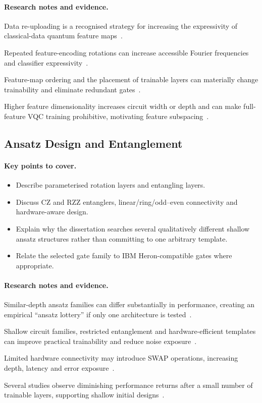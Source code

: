 \documentclass[]{UCD_CS_MSc_AAI_Report}
\newcommand{\challenge}[1]{{\color{red}#1}}
\newcommand{\method}[1]{{\color{cyan!80!black}#1}}
\newcommand{\result}[1]{{\color{green!60!black}#1}}
\newcommand{\comparison}[1]{{\color{pink!70!violet}#1}}
\newcommand{\sectionbrief}{\paragraph{Key points to cover.}}
\newcommand{\researchnotes}{\paragraph{Research notes and evidence.}}
\begin{document}
\researchnotes
\begin{itemize}
    \method{\item Data re-uploading is a recognised strategy for increasing the expressivity of classical-data quantum feature maps~\cite{du_quantum_2025}.}
    \method{\item Repeated feature-encoding rotations can increase accessible Fourier frequencies and classifier expressivity~\cite{mcfarthing_classical_2024}.}
    \comparison{\item Feature-map ordering and the placement of trainable layers can materially change trainability and eliminate redundant gates~\cite{salmenpera_impact_2024}.}
    \challenge{\item Higher feature dimensionality increases circuit width or depth and can make full-feature VQC training prohibitive, motivating feature subspacing~\cite{radojicic_reducing_2026}.}
\end{itemize}

\subsection{Ansatz Design and Entanglement}

\sectionbrief
\begin{itemize}
    \item Describe parameterised rotation layers and entangling layers.
    \item Discuss CZ and RZZ entanglers, linear/ring/odd--even connectivity and hardware-aware design.
    \item Explain why the dissertation searches several qualitatively different shallow ansatz structures rather than committing to one arbitrary template.
    \item Relate the selected gate family to IBM Heron-compatible gates where appropriate.
\end{itemize}

\researchnotes
\begin{itemize}
    \challenge{\item Similar-depth ansatz families can differ substantially in performance, creating an empirical ``ansatz lottery'' if only one architecture is tested~\cite{pinto_composing_2026}.}
    \method{\item Shallow circuit families, restricted entanglement and hardware-efficient templates can improve practical trainability and reduce noise exposure~\cite{friedrich_quantum_2025,park_addressing_2025}.}
    \challenge{\item Limited hardware connectivity may introduce SWAP operations, increasing depth, latency and error exposure~\cite{resch_quantum_2019}.}
    \result{\item Several studies observe diminishing performance returns after a small number of trainable layers, supporting shallow initial designs~\cite{salmenpera_impact_2024,incudini_resource_2023}.}
\end{itemize}
\end{document}
